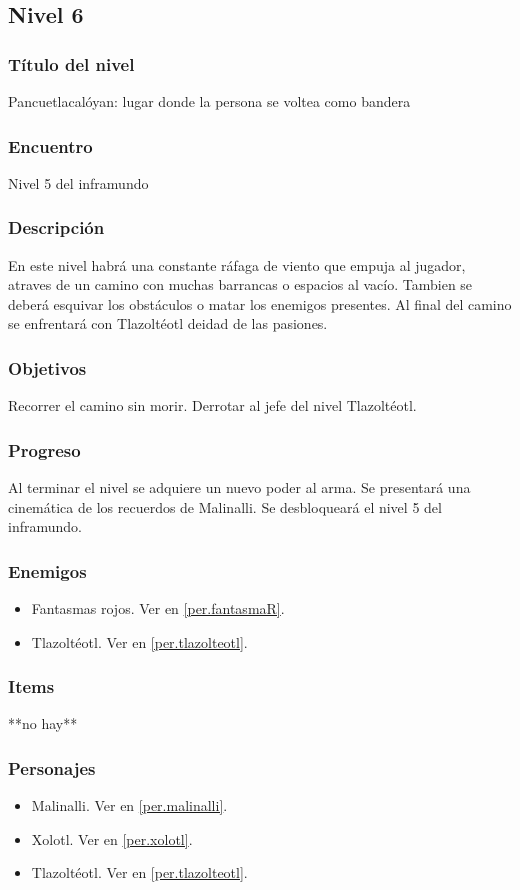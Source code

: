 \documentclass[11pt,letterpaper]{article}
\begin{document}
	
		\subsection{Nivel 6}
	\subsubsection{Título del nivel}
	Pancuetlacalóyan: lugar donde la persona se voltea como bandera
	\subsubsection{Encuentro}
	Nivel 5 del inframundo
	\subsubsection{Descripción}
	En este nivel habrá una constante ráfaga de viento que empuja al jugador, atraves de un camino con muchas barrancas o espacios al vacío. Tambien se deberá esquivar los obstáculos o matar los enemigos presentes. Al final del camino se enfrentará con Tlazoltéotl deidad de las pasiones.
	\subsubsection{Objetivos}
	Recorrer el camino sin morir. Derrotar al jefe del nivel Tlazoltéotl.
	\subsubsection{Progreso}
	Al terminar el nivel se adquiere un nuevo poder al arma. Se presentará una cinemática de los recuerdos de Malinalli. Se desbloqueará el nivel 5 del inframundo.
	\subsubsection{Enemigos}
	\begin{itemize}
		\item Fantasmas rojos. Ver en \ref{per.fantasmaR}.
		\item Tlazoltéotl. Ver en \ref{per.tlazolteotl}.
	\end{itemize}
	\subsubsection{Items}
	**no hay**
	\subsubsection{Personajes}
	\begin{itemize}
		\item Malinalli. Ver en \ref{per.malinalli}.
		\item Xolotl. Ver en \ref{per.xolotl}.
		\item Tlazoltéotl. Ver en \ref{per.tlazolteotl}.
	\end{itemize}
\end{document}
